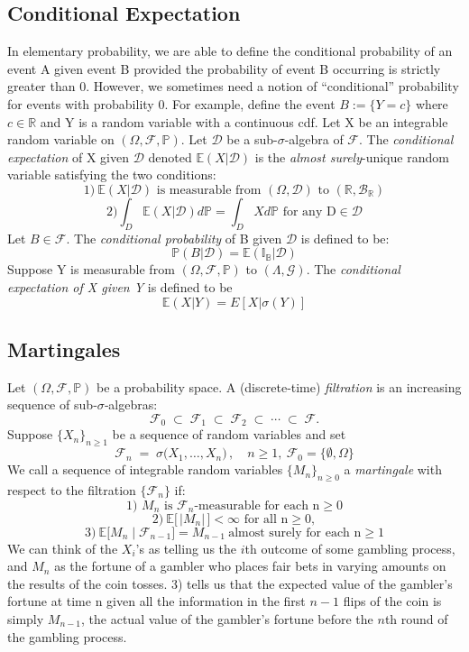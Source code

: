 \documentclass{article}
\begin{document}
\subsection{Conditional Expectation}
In elementary probability, we are able to define the conditional probability of an event A given event B provided the probability of event B occurring is strictly greater than 0. However, we sometimes need a notion of ``conditional'' probability for events with probability 0. For example, define the event $B:=\{Y=c\}$ where $c\in \mathbb{R}$ and Y is a random variable with a continuous cdf.\newline \newline
Let X be an integrable random variable on $(\Omega,\mathcal{F},\mathbb{P})$. Let $\mathcal{D}$ be a sub-$\sigma$-algebra of $\mathcal{F}$. The \emph{conditional expectation} of X given $\mathcal{D}$ denoted $\mathbb{E}(X|\mathcal{D})$ is the \emph{almost surely}-unique random variable satisfying the two conditions:
\[
1) \ \mathbb{E}(X|\mathcal{D}) \text{ is measurable from } (\Omega,\mathcal{D}) \text{ to } (\mathbb{R},\mathcal{B}_{\mathbb{R}})
\]
\[
2) \int_D\mathbb{E}(X|\mathcal{D})d\mathbb{P}=\int_DXd\mathbb{P} \text{ for any D}\in\mathcal{D}
\]
Let $B\in \mathcal{F}$. The \emph{conditional probability} of B given $\mathcal{D}$ is defined to be:
\[
\mathbb{P}(B|\mathcal{D})= \mathbb{E}(\mathbb{I_B|\mathcal{D}})
\]
Suppose Y is measurable from $(\Omega,\mathcal{F},\mathbb{P})$ to  $(\Lambda,\mathcal{G})$. The \emph{conditional expectation of X given Y} is defined to be
\[
\mathbb{E}(X|Y)=E[X|\sigma(Y)]
\]
\subsection{Martingales}
Let $(\Omega,\mathcal{F},\mathbb{P})$ be a probability space.  A (discrete‐time) \emph{filtration} is an increasing sequence of sub‐$\sigma$‐algebras:
\[
  \mathcal{F}_0 \;\subset\;\mathcal{F}_1\;\subset\;\mathcal{F}_2\;\subset\;\cdots\;\subset\;\mathcal{F}.
\]
Suppose $\{X_n\}_{n\ge1}$ be a sequence of random variables and set
\[
  \mathcal F_n \;=\;\sigma\bigl(X_1,\dots,X_n\bigr)\,,\quad n\ge1, \ \mathcal F_0=\{\emptyset,\Omega\}
\]
We call a sequence of integrable random variables $\{M_n\}_{n\ge0}$ a \emph{martingale} with respect to the filtration $\{\mathcal F_n\}$ if:
\[
\text{1) }M_n \text{ is } \mathcal{F}_n\text{‐measurable for each n}  \ge 0
\]
\[
2)\ \mathbb{E}\bigl[\,|M_n|\,\bigr]<\infty \text{ for all n}\ge0,
\]
\[
3) \ \mathbb{E}\bigl[M_n\mid \mathcal F_{n-1}\bigr]=M_{n-1}\ \text{almost surely for each n}\ge1
\]
We can think of the $X_i$'s as telling us the $i$th outcome of some gambling process, and $M_n$ as the fortune of a gambler who places fair bets in varying amounts on the results of the coin tosses. 3) tells us that the expected value of the gambler's fortune at time n given all the information in the first $n-1$ flips of the coin is simply $M_{n-1}$, the actual value of the gambler's fortune before the $n$th round of the gambling process.
\end{document}
